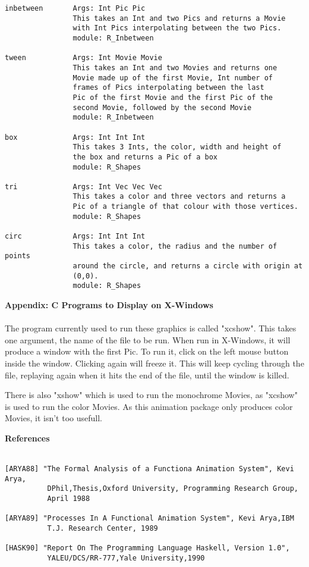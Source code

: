 \begin{verbatim}
inbetween       Args: Int Pic Pic
                This takes an Int and two Pics and returns a Movie 
                with Int Pics interpolating between the two Pics.
                module: R_Inbetween

tween           Args: Int Movie Movie
                This takes an Int and two Movies and returns one
                Movie made up of the first Movie, Int number of
                frames of Pics interpolating between the last
                Pic of the first Movie and the first Pic of the
                second Movie, followed by the second Movie
                module: R_Inbetween

box             Args: Int Int Int
                This takes 3 Ints, the color, width and height of 
                the box and returns a Pic of a box
                module: R_Shapes

tri             Args: Int Vec Vec Vec
                This takes a color and three vectors and returns a
                Pic of a triangle of that colour with those vertices.
                module: R_Shapes

circ            Args: Int Int Int
                This takes a color, the radius and the number of points
                around the circle, and returns a circle with origin at
                (0,0).
                module: R_Shapes
\end{verbatim}

\pagebreak
\large {\bf Appendix:  C Programs to Display on X-Windows}
\\
\\
	The program currently used to run these graphics is called "xcshow".
This takes one argument, the name of the file to be run. When run
in X-Windows, it will produce a window with the first Pic. To run it, click
on the left mouse button inside the window. Clicking again will freeze it.
This will keep cycling through the file, replaying again when it hits the
end of the file, until the window is killed.

	There is also "xshow" which is used to run the monochrome Movies, as
"xcshow" is used to run the color Movies. As this animation package
only produces color Movies, it isn't too usefull.


\pagebreak
\large {\bf References}
\\
\\
\begin{verbatim}
[ARYA88] "The Formal Analysis of a Functiona Animation System", Kevi Arya,
          DPhil,Thesis,Oxford University, Programming Research Group,
          April 1988

[ARYA89] "Processes In A Functional Animation System", Kevi Arya,IBM
          T.J. Research Center, 1989 

[HASK90] "Report On The Programming Language Haskell, Version 1.0",
          YALEU/DCS/RR-777,Yale University,1990
\end{verbatim}


